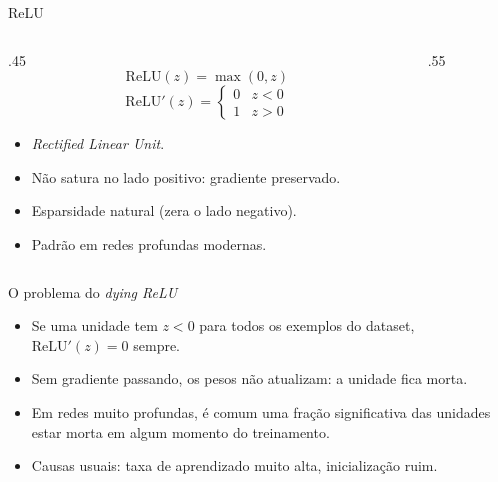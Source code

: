 \documentclass[aspectratio=169,xcolor=dvipsnames]{beamer}
\begin{document}
  \begin{frame}{ReLU}
    \begin{columns}
      \begin{column}{.45\linewidth}
        \[
          \mathrm{ReLU}(z) = \max(0,z)
        \]
        \[
          \mathrm{ReLU}'(z) =
            \begin{cases}
              0 & z < 0 \\
              1 & z > 0
            \end{cases}
        \]
        \begin{itemize}
          \item \textit{Rectified Linear Unit}.
          \item Não satura no lado positivo: gradiente preservado.
          \item Esparsidade natural (zera o lado negativo).
          \item Padrão em redes profundas modernas.
        \end{itemize}
      \end{column}
      \begin{column}{.55\linewidth}
        \centering
      \end{column}
    \end{columns}
  \end{frame}

  \begin{frame}{O problema do \textit{dying ReLU}}
    \begin{itemize}
      \item Se uma unidade tem $z<0$ para todos os exemplos do dataset, $\mathrm{ReLU}'(z)=0$
        sempre.
      \item Sem gradiente passando, os pesos não atualizam: a unidade fica \alert{morta}.
      \item Em redes muito profundas, é comum uma fração significativa das unidades estar morta
        em algum momento do treinamento.
      \item Causas usuais: taxa de aprendizado muito alta, inicialização ruim.
    \end{itemize}
  \end{frame}
\end{document}

